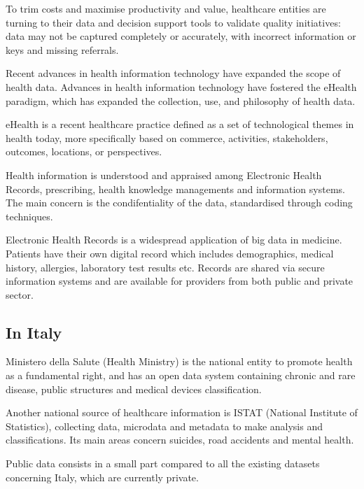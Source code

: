 To trim costs and maximise productivity and value, healthcare entities are turning to their data and decision support tools to validate quality initiatives: data may not be captured completely or accurately, with incorrect information or keys and missing referrals.

Recent advances in health information technology have expanded the scope of health data. Advances in health information technology have fostered the eHealth paradigm, which has expanded the collection, use, and philosophy of health data.

eHealth is a recent healthcare practice defined as a set of technological themes in health today, more specifically based on commerce, activities, stakeholders, outcomes, locations, or perspectives\cite{ehealth}.

Health information is understood and appraised among Electronic Health Records, prescribing, health knowledge managements and information systems. The main concern is the condifentiality of the data, standardised through coding techniques.

Electronic Health Records is a widespread application of big data in medicine. Patients have their own digital record which includes demographics, medical history, allergies, laboratory test results etc. Records are shared via secure information systems and are available for providers from both public and private sector\cite{datapine}.

\subsection{In Italy}


Ministero della Salute (Health Ministry) is the national entity to promote health as a fundamental right, and has an open data system containing chronic and rare disease, public structures and medical devices classification. 

Another national source of healthcare information is ISTAT (National Institute of Statistics), collecting data, microdata and metadata to make analysis and classifications. Its main areas concern suicides, road accidents and mental health.

Public data consists in a small part compared to all the existing datasets concerning Italy, which are currently private.

